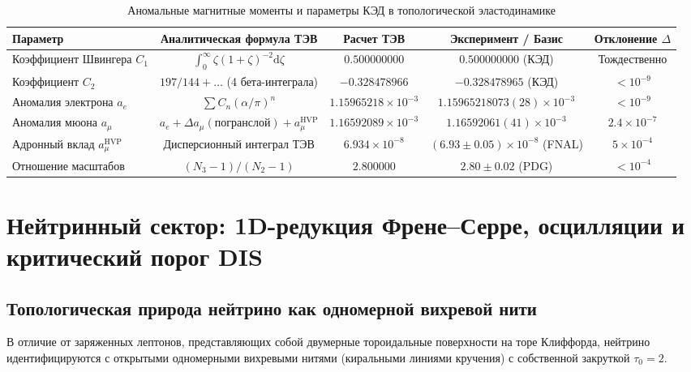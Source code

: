 \documentclass[12pt,a4paper]{article}
\theoremstyle{definition}
\theoremstyle{remark}
\begin{document}
\begin{table}[h!]
	\centering
	\small
	\caption{Аномальные магнитные моменты и параметры КЭД в топологической эластодинамике}
	\label{tab:g2_results}
	\vspace{2mm}
	\begin{tabular}{lcccc}
		\toprule
		\textbf{Параметр} & \textbf{Аналитическая формула ТЭВ} & \textbf{Расчет ТЭВ} & \textbf{Эксперимент / Базис} & \textbf{Отклонение $\Delta$} \\
		\midrule
		Коэффициент Швингера $C_1$ & $\int_0^\infty \zeta(1+\zeta)^{-2}\mathrm{d}\zeta$ & $0.500000000$ & $0.500000000$ (КЭД) & Тождественно \\
		Коэффициент $C_2$          & $197/144 + \dots$ (4 бета-интеграла)             & $-0.328478966$      & $-0.328478965$ (КЭД)      & $< 10^{-9}$ \\
		Аномалия электрона $a_e$   & $\sum C_n (\alpha/\pi)^n$                        & $1.15965218 \times 10^{-3}$ & $1.15965218073(28)\times 10^{-3}$ & $< 10^{-9}$ \\
		Аномалия мюона $a_\mu$     & $a_e + \Delta a_\mu(\text{погранслой}) + a_\mu^{\mathrm{HVP}}$ & $1.16592089 \times 10^{-3}$ & $1.16592061(41) \times 10^{-3}$ & $2.4 \times 10^{-7}$ \\
		Адронный вклад $a_\mu^{\mathrm{HVP}}$ & Дисперсионный интеграл ТЭВ            & $6.934 \times 10^{-8}$ & $(6.93 \pm 0.05) \times 10^{-8}$ (FNAL) & $5 \times 10^{-4}$ \\
		Отношение масштабов        & $(N_3-1)/(N_2-1)$                                & $2.800000$          & $2.80 \pm 0.02$ (PDG)     & $< 10^{-4}$ \\
		\bottomrule
	\end{tabular}
\end{table}
		

\section{Нейтринный сектор: 1D-редукция Френе--Серре, осцилляции и критический порог DIS}
\label{sec:neutrino}

\subsection{Топологическая природа нейтрино как одномерной вихревой нити}
В отличие от заряженных лептонов, представляющих собой двумерные тороидальные поверхности на торе Клиффорда, нейтрино идентифицируются с открытыми одномерными вихревыми нитями (киральными линиями кручения) с собственной закруткой $\tau_0 = 2$.
\end{document}
